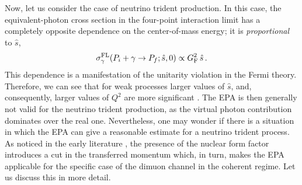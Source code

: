 Now, let us consider the case of neutrino trident production. In this case, the equivalent-photon cross section in the four-point interaction limit has a completely opposite dependence on the center-of-mass energy; it is \emph{proportional} to $\hat{s}$,
\begin{align*}
	\sigma_\gamma^{\rm FL}(P_i + \gamma \to P_f; \hat{s}, 0)\propto G_{\rm F}^2\, \hat{s}\, .
\end{align*}
This dependence is a manifestation of the unitarity violation in the Fermi theory. Therefore, we can see that for weak processes larger values of $\hat{s}$, and, consequently, larger values of $Q^2$ are more significant \cite{Kozhushner:1962aa, Shabalin:1963aa}.  The EPA is then generally not valid for the neutrino trident production, as the virtual photon contribution dominates over the real one. Nevertheless, one may wonder if there is a situation  in which the EPA can give a reasonable estimate for a neutrino trident process. 
As noticed in the early literature \cite{Kozhushner:1962aa, Shabalin:1963aa}, the presence of the nuclear form factor introduces a cut in the transferred momentum which, in turn, makes the EPA applicable for the specific case of the dimuon channel in the coherent regime. Let us discuss this in more detail. 

